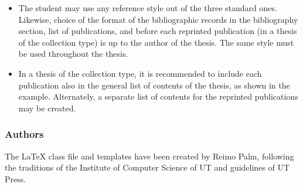 \begin{itemize}
\item The student may use any reference style out of the three standard ones. Likewise, choice of the format of the bibliographic records in the bibliography section, list of publications, and before each reprinted publication (in a thesis of the collection type) is up to the author of the thesis. The same style must be used throughout the thesis.
\item In a thesis of the collection type, it is recommended to include each publication also in the general list of contents of the thesis, as shown in the example. Alternately, a separate list of contents for the reprinted publications may be created.

\end{itemize}

\subsubsection{Authors}
The LaTeX class file and templates have been created by Reimo Palm, following the traditions of the Institute of Computer Science of UT and guidelines of UT Press.
